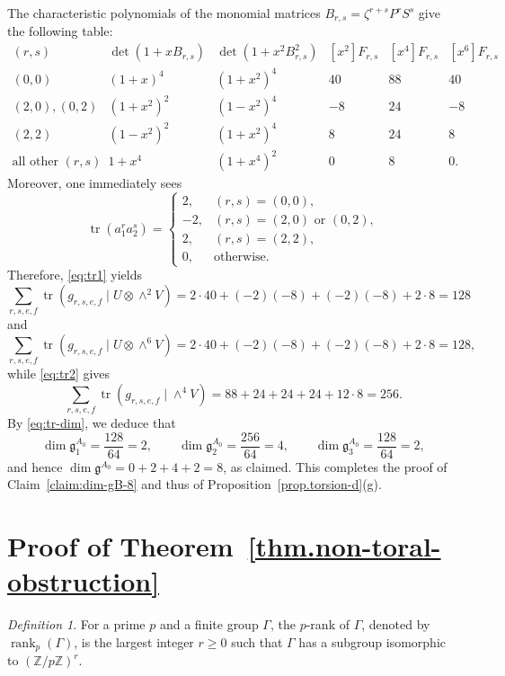 \documentclass[12pt]{amsart}
\numberwithin{equation}{section}
\theoremstyle{remark}
\newtheorem{definition}[theorem]{Definition}
\newcommand{\on}{\operatorname}
\begin{document}
The characteristic polynomials of the monomial matrices
$B_{r,s}=\zeta^{r+s}P^rS^s$ give the following table:
\[
\begin{array}{c|c|c|c|c|c}
(r,s)&\det(1+xB_{r,s})&\det(1+x^2B_{r,s}^2)&[x^2]F_{r,s}&[x^4]F_{r,s}&[x^6]F_{r,s}\\
\hline
(0,0)&(1+x)^4&(1+x^2)^4&40&88&40\\
(2,0),(0,2)&(1+x^2)^2&(1-x^2)^4&-8&24&-8\\
(2,2)&(1-x^2)^2&(1+x^2)^4&8&24&8\\
\text{all other }(r,s)
&1+x^4&(1+x^4)^2&0&8&0.
\end{array}
\]
Moreover, one immediately sees
\[
        \operatorname{tr}(a_1^r a_2^s)
        =
        \begin{cases}
        2, & (r,s)=(0,0),\\
        -2, & (r,s)=(2,0)\text{ or }(0,2),\\
        2, & (r,s)=(2,2),\\
        0, & \text{otherwise}.
        \end{cases}
\]
Therefore, \eqref{eq:tr1} yields
\[
\sum_{r,s,e,f}\operatorname{tr}(g_{r,s,e,f}\mid U\otimes\wedge^2V)=
2\cdot 40+(-2)(-8)+(-2)(-8)+2\cdot 8=128\]
and
\[
\sum_{r,s,e,f}\operatorname{tr}(g_{r,s,e,f}\mid U\otimes\wedge^6V)=2\cdot 40+(-2)(-8)+(-2)(-8)+2\cdot 8=128,\]
while \eqref{eq:tr2} gives
\[
\sum_{r,s,e,f}\operatorname{tr}(g_{r,s,e,f}\mid \wedge^4V)=
88+24+24+24+12\cdot 8=256.\]
By \eqref{eq:tr-dim}, we deduce that
\[
        \dim \mathfrak g_{1}^{A_0}=\frac{128}{64}=2,\qquad
        \dim \mathfrak g_{2}^{A_0}=\frac{256}{64}=4,\qquad
        \dim \mathfrak g_{3}^{A_0}=\frac{128}{64}=2,
\]
and hence $\dim \mathfrak g^{A_0}=0+2+4+2=8$, as claimed. This completes the proof of Claim~\ref{claim:dim-gB-8} and thus of Proposition~\ref{prop.torsion-d}(g).



\section{Proof of Theorem~\ref{thm.non-toral-obstruction}}
\label{sect.genus1}
   
\begin{definition}	For a prime $p$ and a finite group $\Gamma$, the $p$-rank of $\Gamma$, denoted by $\on{rank}_p(\Gamma)$, is the largest integer $r\geqslant 0$ such that $\Gamma$ has a subgroup isomorphic to $(\mathbb{Z}/p\mathbb{Z})^r$.
\end{definition}
 
\end{document}
